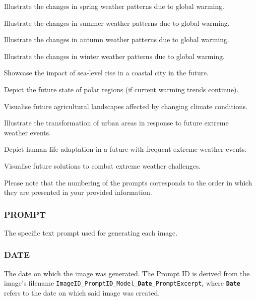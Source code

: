 \begin{description}[leftmargin=2.5cm, style = multiline, labelwidth=1.5cm]
\item[20] Illustrate the changes in spring weather patterns due to global warming.

\item[21] Illustrate the changes in summer weather patterns due to global warming.

\item[22] Illustrate the changes in autumn weather patterns due to global warming.

\item[23] Illustrate the changes in winter weather patterns due to global warming.

\item[24] Showcase the impact of sea-level rise in a coastal city in the future.

\item[25] Depict the future state of polar regions (if current warming trends continue).

\item[26] Visualise future agricultural landscapes affected by changing climate conditions.
\item[27] Illustrate the transformation of urban areas in response to future extreme weather events.
\item[28] Depict human life adaptation in a future with frequent extreme weather events.
\item[29] Visualise future solutions to combat extreme weather challenges.
\end{description}

Please note that the numbering of the prompts corresponds to the order in which they are presented in your provided information.


\subsubsection*{PROMPT}

 The specific text prompt used for generating each image.

 \subsubsection*{DATE} 

The date on which the image was generated. The Prompt ID is derived from the image's filename \texttt{ImageID\_PromptID\_Model\_\textbf{Date}\_PromptExcerpt}, where \texttt{\textbf{Date}} refers to the date on which said image was created.
